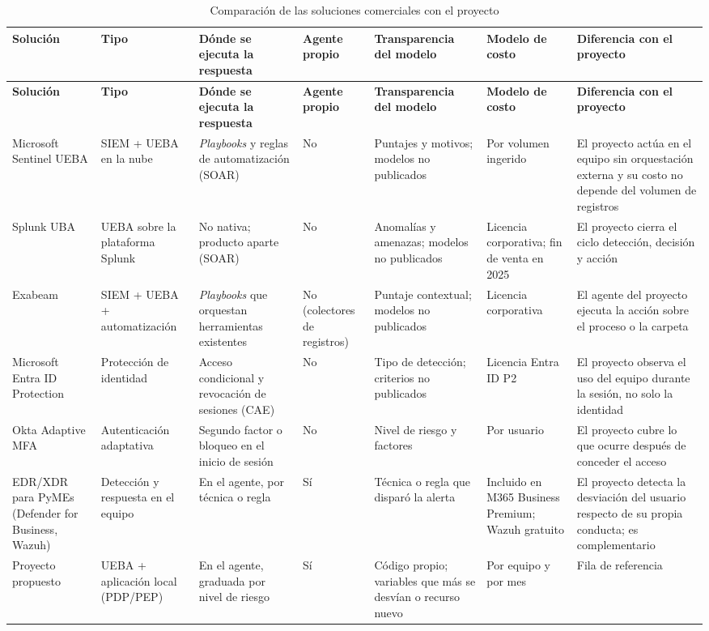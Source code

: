 {\footnotesize
\begin{longtable}{>{\raggedright\arraybackslash}p{1.8cm}>{\raggedright\arraybackslash}p{1.7cm}>{\raggedright\arraybackslash}p{2.3cm}>{\raggedright\arraybackslash}p{1.4cm}>{\raggedright\arraybackslash}p{1.9cm}>{\raggedright\arraybackslash}p{1.7cm}>{\raggedright\arraybackslash}p{2.6cm}}
	\caption{Comparación de las soluciones comerciales con el proyecto}
	\label{tab:comparacion-comercial}\\
	\hline
	\textbf{Solución} & \textbf{Tipo} & \textbf{Dónde se ejecuta la respuesta} & \textbf{Agente propio} & \textbf{Transparencia del modelo} & \textbf{Modelo de costo} & \textbf{Diferencia con el proyecto} \\
	\hline
	\endfirsthead
	\hline
	\textbf{Solución} & \textbf{Tipo} & \textbf{Dónde se ejecuta la respuesta} & \textbf{Agente propio} & \textbf{Transparencia del modelo} & \textbf{Modelo de costo} & \textbf{Diferencia con el proyecto} \\
	\hline
	\endhead
	Microsoft Sentinel UEBA & SIEM + UEBA en la nube & \emph{Playbooks} y reglas de automatización (SOAR) & No & Puntajes y motivos; modelos no publicados & Por volumen ingerido & El proyecto actúa en el equipo sin orquestación externa y su costo no depende del volumen de registros \\
	\hline
	Splunk UBA & UEBA sobre la plataforma Splunk & No nativa; producto aparte (SOAR) & No & Anomalías y amenazas; modelos no publicados & Licencia corporativa; fin de venta en 2025 & El proyecto cierra el ciclo detección, decisión y acción \\
	\hline
	Exabeam & SIEM + UEBA + automatización & \emph{Playbooks} que orquestan herramientas existentes & No (colectores de registros) & Puntaje contextual; modelos no publicados & Licencia corporativa & El agente del proyecto ejecuta la acción sobre el proceso o la carpeta \\
	\hline
	Microsoft Entra ID Protection & Protección de identidad & Acceso condicional y revocación de sesiones (CAE) & No & Tipo de detección; criterios no publicados & Licencia Entra ID P2 & El proyecto observa el uso del equipo durante la sesión, no solo la identidad \\
	\hline
	Okta Adaptive MFA & Autenticación adaptativa & Segundo factor o bloqueo en el inicio de sesión & No & Nivel de riesgo y factores & Por usuario & El proyecto cubre lo que ocurre después de conceder el acceso \\
	\hline
	EDR/XDR para PyMEs (Defender for Business, Wazuh) & Detección y respuesta en el equipo & En el agente, por técnica o regla & Sí & Técnica o regla que disparó la alerta & Incluido en M365 Business Premium; Wazuh gratuito & El proyecto detecta la desviación del usuario respecto de su propia conducta; es complementario \\
	\hline
	Proyecto propuesto & UEBA + aplicación local (PDP/PEP) & En el agente, graduada por nivel de riesgo & Sí & Código propio; variables que más se desvían o recurso nuevo & Por equipo y por mes & Fila de referencia \\
	\hline
\end{longtable}
}
